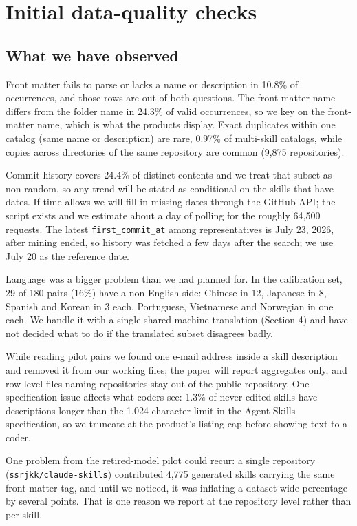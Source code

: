 \documentclass[11pt]{article}
\begin{document}
\section{Initial data-quality checks}

\subsection{What we have observed}
Front matter fails to parse or lacks a name or description in 10.8\% of occurrences, and those rows are out of both
questions. The front-matter name differs from the folder name in 24.3\% of valid occurrences, so we key on the front-matter
name, which is what the products display. Exact duplicates within one catalog (same name or description) are rare, 0.97\% of
multi-skill catalogs, while copies across directories of the same repository are common (9{,}875 repositories).

Commit history covers 24.4\% of distinct contents and we treat that subset as non-random, so any trend will be stated as
conditional on the skills that have dates. If time allows we will fill in missing dates through the GitHub API; the script
exists and we estimate about a day of polling for the roughly 64{,}500 requests. The latest \texttt{first\_commit\_at} among
representatives is July 23, 2026, after mining ended, so history was fetched a few days after the search; we use July 20 as
the reference date.

Language was a bigger problem than we had planned for. In the calibration set, 29 of 180 pairs (16\%) have a non-English
side: Chinese in 12, Japanese in 8, Spanish and Korean in 3 each, Portuguese, Vietnamese and Norwegian in one each. We handle
it with a single shared machine translation (Section 4) and have not decided what to do if the translated subset disagrees
badly.

While reading pilot pairs we found one e-mail address inside a skill description and removed it from our working files; the
paper will report aggregates only, and row-level files naming repositories stay out of the public repository. One
specification issue affects what coders see: 1.3\% of never-edited skills have descriptions longer than the
1{,}024-character limit in the Agent Skills specification, so we truncate at the product's listing cap before showing text
to a coder.

One problem from the retired-model pilot could recur: a single repository (\texttt{ssrjkk/claude-skills}) contributed
4{,}775 generated skills carrying the same front-matter tag, and until we noticed, it was inflating a dataset-wide
percentage by several points. That is one reason we report at the repository level rather than per skill.
\end{document}
